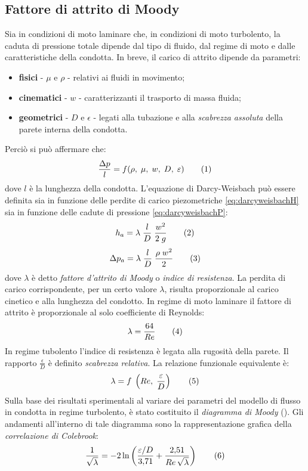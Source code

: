 \subsection{Fattore di attrito di Moody}
Sia in condizioni di moto laminare che, in condizioni di moto turbolento, la caduta di pressione totale dipende dal tipo di fluido, dal regime di moto e dalle caratteristiche della condotta. In breve, il carico di attrito dipende da parametri:
\begin{itemize}
    \item \textbf{fisici} - \(\mu\) e \(\rho\) - relativi ai fluidi in movimento;
    \item \textbf{cinematici} - \(w\) - caratterizzanti il trasporto di massa fluida;
    \item \textbf{geometrici} - \(D\) e \(\epsilon\) - legati alla tubazione e alla \textit{scabrezza assoluta} della parete interna della condotta.
\end{itemize}
Perciò si può affermare che:
\[\frac{\Delta p}{l}=f(\rho, \; \mu, \; w, \; D, \; \epsilon) \addtag \label{eq:funzcaduta} \]
dove \(l\) è la lunghezza della condotta. L'equazione di Darcy-Weisbach può essere definita sia in funzione delle perdite di carico piezometriche \eqref{eq:darcyweisbachH} sia in funzione delle cadute di pressione \eqref{eq:darcyweisbachP}:
\[h_a = \lambda \; \frac{l}{D} \; \frac{w^2}{2 \; g} \addtag \label{eq:darcyweisbachH} \]
\[\Delta p_a = \lambda \; \frac{l}{D} \; \frac{\rho \; w^2}{2} \addtag \label{eq:darcyweisbachP} \]
dove \(\lambda\) è detto \textit{fattore d'attrito di Moody} o \textit{indice di resistenza}. La perdita di carico corrispondente, per un certo valore \(\lambda\), risulta proporzionale al carico cinetico e alla lunghezza del condotto. In regime di moto laminare il fattore di attrito è proporzionale al solo coefficiente di Reynolds:
\[\lambda=\frac{64}{Re} \addtag \]
In regime tubolento l'indice di resistenza è legata alla rugosità della parete. Il rapporto \(\frac{\epsilon}{D}\) è definito \textit{scabrezza relativa}. La relazione funzionale equivalente è:
\[\lambda=f \; \left(Re, \; \frac{\epsilon}{D}\right) \addtag \]
Sulla base dei risultati sperimentali al variare dei parametri del modello di flusso in condotta in regime turbolento, è stato costituito il \textit{diagramma di Moody} (). Gli andamenti all'interno di tale diagramma sono la rappresentazione grafica della \textit{correlazione di Colebrook}:
\[ \frac{1}{\sqrt{\lambda}} = - 2 \ln \left( \frac { \epsilon/D} {3{,}71} + \frac {2{,}51} {Re \, \sqrt{\lambda}} \right) \addtag \label{eq:colebrook} \]

